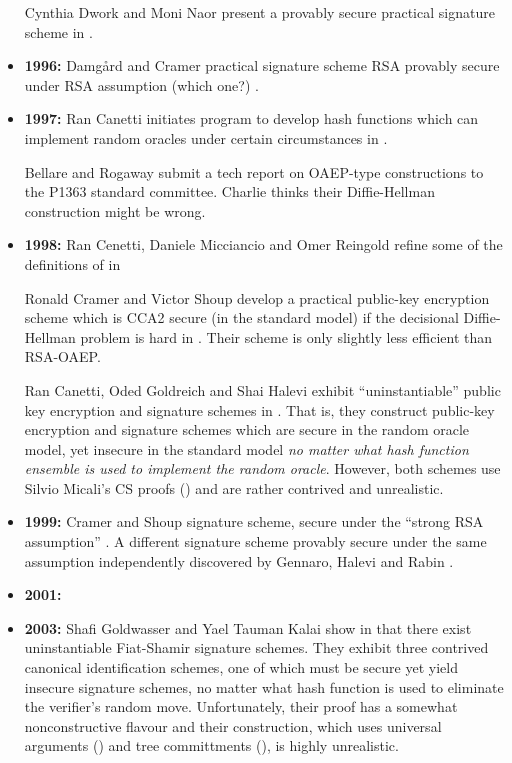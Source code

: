 \documentclass[12pt,twoside]{article}
\theoremstyle{plain}
\begin{document}
\begin{itemize}
Cynthia Dwork and Moni Naor present a provably secure practical signature scheme in
\cite{dwork:signatures}.

\item {\bf 1996:} Damg\aa rd and Cramer practical signature
scheme RSA provably secure under RSA assumption (which one?)
\cite{cramer:signatures}.

\item {\bf 1997:} Ran Canetti initiates program to develop hash functions which can
implement random oracles under certain circumstances in
\cite{canetti:hideinfo}. 

Bellare and Rogaway submit a tech report on
OAEP-type constructions to the P1363 standard committee. Charlie thinks their
Diffie-Hellman construction might be wrong.

\item {\bf 1998:} Ran Cenetti, Daniele Micciancio and Omer Reingold refine
some of the definitions of \cite{canetti:hideinfo} in
\cite{canetti:perfecthash}

Ronald Cramer and Victor Shoup develop a practical public-key encryption scheme which
is CCA2 secure (in the standard model) if
the decisional Diffie-Hellman problem is hard in \cite{cramer:cca2secure}.
Their scheme is only slightly less efficient than RSA-OAEP.

Ran Canetti, Oded Goldreich and Shai Halevi exhibit  ``uninstantiable'' public key
encryption and signature schemes in \cite{canetti:romfails}. That is, they
construct public-key encryption and signature schemes which are
secure in the random oracle model, yet insecure in the standard model 
{\it no matter what hash function ensemble is used to implement the random 
oracle}. However, both schemes use Silvio Micali's CS proofs 
(\cite{micali:csproofs}) and are rather contrived and unrealistic. 

\item {\bf 1999:} Cramer and Shoup signature scheme, secure under the ``strong
RSA assumption'' \cite{cramer:signatures2}. A different signature scheme provably secure under the same
assumption independently discovered by Gennaro, Halevi and Rabin
\cite{gennaro:signatures}.

\item {\bf 2001:} 

\item {\bf 2003:} Shafi Goldwasser and Yael Tauman Kalai show in
\cite{goldwasser:fsparadigmfails} that there exist uninstantiable Fiat-Shamir
signature schemes. They exhibit three contrived canonical identification schemes, one of
which must be secure yet yield insecure signature schemes, no matter what
hash function is used to eliminate the verifier's random move. Unfortunately,
their proof has a somewhat nonconstructive flavour and their 
construction, which uses universal arguments (\cite{barak:universalarguments}) and tree committments (\cite{merkle:tree}), 
is highly unrealistic.

\end{itemize}
\end{document}
